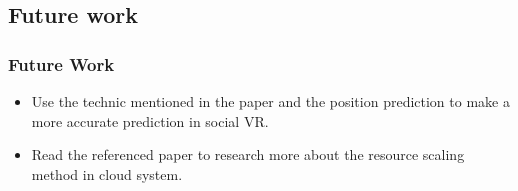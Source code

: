 \documentclass{beamer}
\begin{document}
\subsection{Future work}
	\begin{frame}
	\frametitle{Future Work}
		\begin{itemize}
		\item Use the technic mentioned in the paper and the position prediction to make a more accurate prediction in social VR.
		\item Read the referenced paper to research more about the resource scaling method in cloud system.
		\end{itemize}
	\end{frame}
\end{document}

